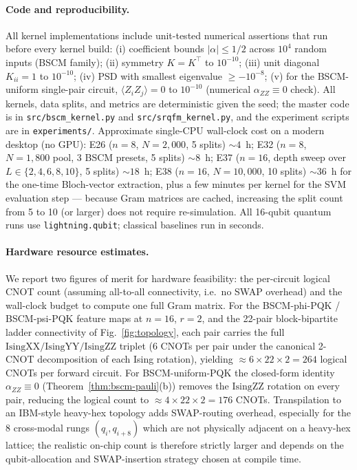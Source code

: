 \documentclass[pdflatex,sn-mathphys]{sn-jnl}
\theoremstyle{plain}
\theoremstyle{remark}
\theoremstyle{definition}
\begin{document}
\paragraph{Code and reproducibility.}
All kernel implementations include unit-tested numerical assertions that run before every kernel build:
(i) coefficient bounds $|\alpha|\le 1/2$ across $10^4$ random inputs (BSCM family);
(ii) symmetry $K=K^\top$ to $10^{-10}$;
(iii) unit diagonal $K_{ii}=1$ to $10^{-10}$;
(iv) PSD with smallest eigenvalue $\ge -10^{-8}$;
(v) for the BSCM-uniform single-pair circuit, $\langle Z_iZ_j\rangle = 0$ to $10^{-10}$ (numerical $\alpha_{ZZ}\equiv 0$ check). All kernels, data splits, and metrics are deterministic given the seed; the master code is in \texttt{src/bscm\_kernel.py} and \texttt{src/srqfm\_kernel.py}, and the experiment scripts are in \texttt{experiments/}. Approximate single-CPU wall-clock cost on a modern desktop (no GPU): E26 ($n=8$, $N=2{,}000$, 5 splits) $\sim\!4$~h; E32 ($n=8$, $N=1{,}800$ pool, 3 BSCM presets, 5 splits) $\sim\!8$~h; E37 ($n=16$, depth sweep over $L\in\{2,4,6,8,10\}$, 5 splits) $\sim\!18$~h; E38 ($n=16$, $N=10{,}000$, 10 splits) $\sim\!36$~h for the one-time Bloch-vector extraction, plus a few minutes per kernel for the SVM evaluation step --- because Gram matrices are cached, increasing the split count from 5 to 10 (or larger) does not require re-simulation. All 16-qubit quantum runs use \texttt{lightning.qubit}; classical baselines run in seconds.

\paragraph{Hardware resource estimates.}
We report two figures of merit for hardware feasibility: the per-circuit logical CNOT count (assuming all-to-all connectivity, i.e.\ no SWAP overhead) and the wall-clock budget to compute one full Gram matrix.
For the BSCM-phi-PQK / BSCM-psi-PQK feature maps at $n=16$, $r=2$, and the 22-pair block-bipartite ladder connectivity of Fig.~\ref{fig:topology}, each pair carries the full $\mathrm{IsingXX}/\mathrm{IsingYY}/\mathrm{IsingZZ}$ triplet (6 CNOTs per pair under the canonical 2-CNOT decomposition of each Ising rotation), yielding $\approx 6\times 22 \times 2 = 264$ logical CNOTs per forward circuit.
For BSCM-uniform-PQK the closed-form identity $\alpha_{ZZ}\equiv 0$ (Theorem~\ref{thm:bscm-pauli}(b)) removes the $\mathrm{IsingZZ}$ rotation on every pair, reducing the logical count to $\approx 4\times 22\times 2 = 176$ CNOTs.
Transpilation to an IBM-style heavy-hex topology adds SWAP-routing overhead, especially for the 8 cross-modal rungs $(q_i, q_{i+8})$ which are not physically adjacent on a heavy-hex lattice; the realistic on-chip count is therefore strictly larger and depends on the qubit-allocation and SWAP-insertion strategy chosen at compile time.
\end{document}
